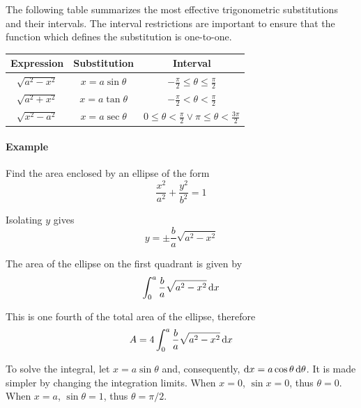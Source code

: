 \documentclass[oneside]{book}
\begin{document}
The following table summarizes the most effective trigonometric substitutions
and their intervals. The interval restrictions are important to ensure that the
function which defines the substitution is one-to-one. \cite{stewart}

\begin{center}
    \begin{tabular}{ |c|c|c| }
        \hline
        Expression & Substitution & Interval \\
        \hline
        \(\sqrt{a^2 - x^2}\)
          & \(x = a\sin\theta\)
          & \(-\frac{\pi}{2} \le \theta \le \frac{\pi}{2}\) \\
        \(\sqrt{a^2 + x^2}\)
          & \(x = a\tan\theta\)
          & \(-\frac{\pi}{2} < \theta < \frac{\pi}{2}\) \\
        \(\sqrt{x^2 - a^2}\)
          & \(x = a\sec\theta\)
          & \(0 \le \theta < \frac{\pi}{2} \lor \pi \le \theta < \frac{3\pi}{2}\) \\
        \hline
    \end{tabular}
\end{center}

\paragraph{Example}
Find the area enclosed by an ellipse of the form
\[\frac{x^2}{a^2} + \frac{y^2}{b^2} = 1\]

Isolating \(y\) gives
\[y = \pm \frac{b}{a} \sqrt{a^2 - x^2}\]

The area of the ellipse on the first quadrant is given by
\[\int_{0}^{a} \frac{b}{a} \sqrt{a^2 - x^2} \dif x\]

This is one fourth of the total area of the ellipse, therefore
\[A = 4 \int_{0}^{a} \frac{b}{a} \sqrt{a^2 - x^2} \dif x\]

To solve the integral, let \(x = a\sin\theta\) and, consequently, \(\dif x = a
\cos \theta \dif \theta\). It is made simpler by changing the integration
limits. When \(x = 0\), \(\sin x = 0\), thus \(\theta = 0\). When \(x = a\),
\(\sin \theta = 1\), thus \(\theta = \pi / 2\).
\end{document}
